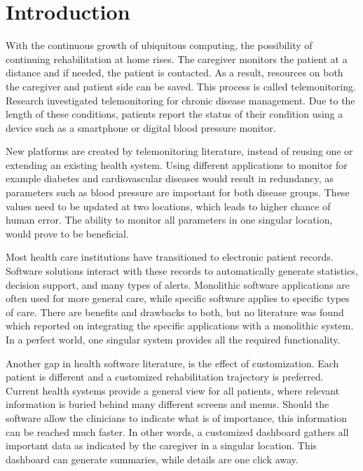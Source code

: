 \section{Introduction}

With the continuous growth of ubiquitous computing, the possibility of continuing rehabilitation at home rises. The caregiver monitors the patient at a distance and if needed, the patient is contacted. As a result, resources on both the caregiver and patient side can be saved. This process is called telemonitoring. Research investigated telemonitoring for chronic disease management. Due to the length of these conditions, patients report the status of their condition using a device such as a smartphone or digital blood pressure monitor.

New platforms are created by telemonitoring literature, instead of reusing one or extending an existing health system. Using different applications to monitor for example diabetes and cardiovascular diseases would result in redundancy, as parameters such as blood pressure are important for both disease groups. These values need to be updated at two locations, which leads to higher chance of human error. The ability to monitor all parameters in one singular location, would prove to be beneficial.

Most health care institutions have transitioned to electronic patient records. Software solutions interact with these records to automatically generate statistics, decision support, and many types of alerts. Monolithic software applications are often used for more general care, while specific software applies to specific types of care. There are benefits and drawbacks to both, but no literature was found which reported on integrating the specific applications with a monolithic system. In a perfect world, one singular system provides all the required functionality.

Another gap in health software literature, is the effect of customization. Each patient is different and a customized rehabilitation trajectory is preferred. Current health systems provide a general view for all patients, where relevant information is buried behind many different screens and menus. Should the software allow the clinicians to indicate what is of importance, this information can be reached much faster. In other words, a customized dashboard gathers all important data as indicated by the caregiver in a singular location. This dashboard can generate summaries, while details are one click away. 

